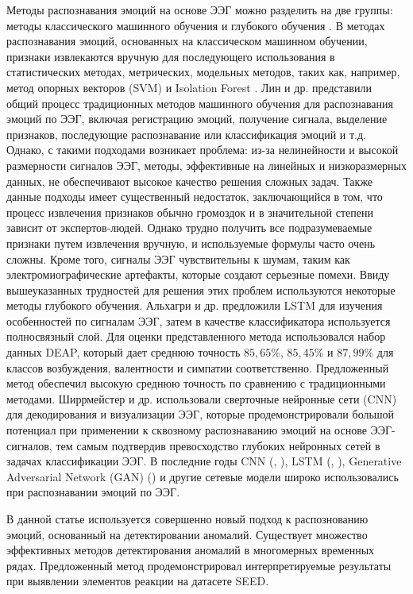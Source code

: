 \documentclass{article}
\begin{document}
Методы распознавания эмоций на основе ЭЭГ можно разделить на две группы: методы классического машинного обучения и глубокого обучения \citep{sensors18}. В методах распознавания эмоций, основанных на классическом машинном обучении, признаки извлекаются вручную для последующего использования в статистических методах, метрических, модельных методов, таких как, например, метод опорных векторов (SVM) \citet{scholkopfsuppor} и Isolation Forest \citet{liu2008isolation}. Лин и др. \citet{sensors18} представили общий процесс традиционных методов машинного обучения для распознавания эмоций по ЭЭГ, включая регистрацию эмоций, получение сигнала, выделение признаков, последующие распознавание или классификация эмоций и т.д. Однако, с такими подходами возникает проблема: из-за нелинейности и высокой размерности сигналов ЭЭГ, методы, эффективные на линейных и низкоразмерных данных, не обеспечивают высокое качество решения сложных задач. Также данные подходы имеет существенный недостаток, заключающийся в том, что процесс извлечения признаков обычно громоздок и в значительной степени зависит от экспертов-людей. Однако трудно получить все подразумеваемые признаки путем извлечения вручную, и используемые формулы часто очень сложны. Кроме того, сигналы ЭЭГ чувствительны к шумам, таким как электромиографические артефакты, которые создают серьезные помехи. Ввиду вышеуказанных трудностей для решения этих проблем используются некоторые методы глубокого обучения. Альхагри и др. \citep{lstm} предложили LSTM для изучения особенностей по сигналам ЭЭГ, затем в качестве классификатора используется полносвязный слой. Для оценки представленного метода использовался набор данных DEAP, который дает среднюю точность $85,65\%$, $85,45\%$ и $87,99\%$ для классов возбуждения, валентности и симпатии соответственно. Предложенный метод обеспечил высокую среднюю точность по сравнению с традиционными методами. Ширрмейстер и др. \citep{cnn} использовали сверточные нейронные сети (CNN) для декодирования и визуализации ЭЭГ, которые продемонстрировали большой потенциал при применении к сквозному распознаванию эмоций на основе ЭЭГ-сигналов, тем самым подтвердив превосходство глубоких нейронных сетей в задачах классификации ЭЭГ. В последние годы CNN (\citep{sensors_cnn}, \citep{med_cnn}), LSTM (\citep{lstm}, \citep{sharma}), Generative Adversarial Network (GAN) (\citep{gan}) и другие сетевые модели широко использовались при распознавании эмоций по ЭЭГ.

В данной статье используется совершенно новый подход к распознованию эмоций, основанный на детектировании аномалий. Существует множество эффективных методов детектирования аномалий в многомерных временных рядах. Предложенный метод продемонстрировал интерпретируемые результаты при выявлении элементов реакции на датасете SEED\citep{seed}.
\end{document}
